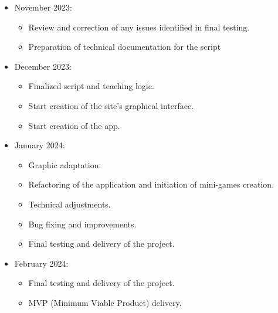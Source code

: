 \documentclass[12pt]{article}
\begin{document}
\begin{itemize}
\item November 2023:
\begin{itemize}
\item Review and correction of any issues identified in final testing.
\item Preparation of technical documentation for the script 
\end{itemize}

\item December 2023:
\begin{itemize}
\item Finalized script and teaching logic.
\item Start creation of the site's graphical interface.
\item Start creation of the app. 
\end{itemize}

\item January 2024:
\begin {itemize}
\item Graphic adaptation.
\item Refactoring of the application and initiation of mini-games creation.
\item Technical adjustments.
\item Bug fixing and improvements.
\item Final testing and delivery of the project.
\end {itemize}

\item February 2024:
\begin {itemize}
\item Final testing and delivery of the project.
\item MVP (Minimum Viable Product) delivery.
\end {itemize}

\end{itemize}
\end{document}

